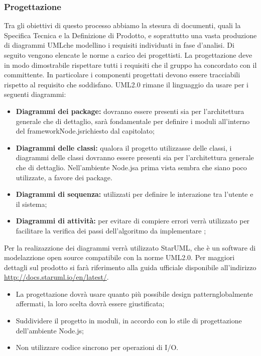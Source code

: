\documentclass[a4paper,11pt]{article}
\begin{document}
		\subsubsection{ Progettazione}
			Tra gli obiettivi di questo processo abbiamo la stesura di documenti, quali la Specifica Tecnica e la Definizione di Prodotto, e soprattutto una vasta produzione di diagrammi UML\addglos che modellino i requisiti individuati in fase d'analisi. Di seguito vengono elencate le norme a carico dei progettisti.
			La progettazione deve in modo dimostrabile rispettare tutti i requisiti che il gruppo ha concordato con il committente. In particolare i componenti progettati devono essere tracciabili rispetto al requisito che soddisfano.
			 \label{subsec:UML}
			UML2.0 rimane il linguaggio da usare per i seguenti diagrammi:
			\begin{itemize}
			\item\textbf{Diagrammi dei package\addglos:} dovranno essere presenti sia per l'architettura generale che di dettaglio, sarà fondamentale per definire i moduli all'interno del framework\addglos Node.js\addglos richiesto dal capitolato;
			\item\textbf{Diagrammi delle classi:} qualora il progetto utilizzasse delle classi, i diagrammi delle classi dovranno essere presenti sia per l'architettura generale che di dettaglio. Nell'ambiente Node.js\addglos a prima vista sembra che siano poco utilizzate, a favore dei package\addglos.
			\item\textbf{Diagrammi di sequenza:} utilizzati per definire le interazione tra l'utente e il sistema;
			\item\textbf{Diagrammi di attività:} per evitare di compiere errori verrà utilizzato per facilitare la verifica dei passi dell'algoritmo da implementare ;
			\end{itemize}
			Per la realizazzione dei diagrammi verrà utilizzato StarUML\addglos, che è un software di modelazzione open source compatibile con la norme UML2.0. Per maggiori dettagli sul prodotto si farà riferimento alla guida ufficiale disponibile all'indirizzo \url{http://docs.staruml.io/en/latest/}.
				\begin{itemize}
				\item La progettazione dovrà usare quanto più possibile design pattern\addglos globalmente affermati, la loro scelta dovrà essere giustificata;
				\item Suddividere il progetto in moduli, in accordo con lo stile di progettazione dell'ambiente Node.js\addglos;
				\item Non utilizzare codice sincrono per operazioni di I/O\addglos.
				
				\end{itemize}
\end{document}
